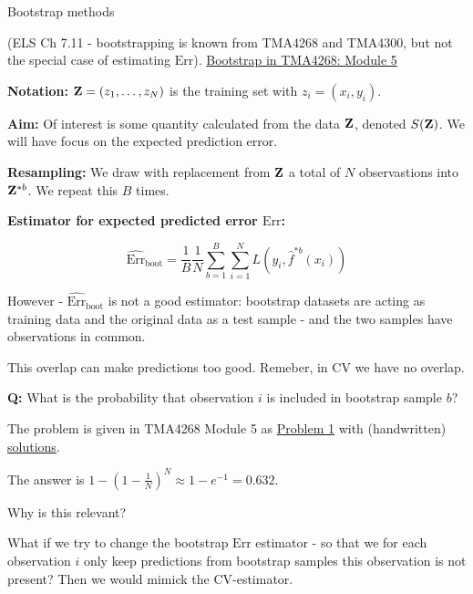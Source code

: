 \documentclass[
  ignorenonframetext,
]{beamer}
\begin{document}
\begin{frame}

\begin{block}{Bootstrap methods}

(ELS Ch 7.11 - bootstrapping is known from TMA4268 and TMA4300, but not
the special case of estimating \(\text{Err}\)).
\href{https://www.math.ntnu.no/emner/TMA4268/2019v/5Resample/5Resample.html\#the_bootstrap}{Bootstrap
in TMA4268: Module 5}

\textbf{Notation:} \({\bf Z}=(z_1,\ldots,z_N)\) is the training set with
\(z_i=(x_i,y_i)\).

\textbf{Aim:} Of interest is some quantity calculated from the data
\({\bf Z}\), denoted \(S({\bf Z})\). We will have focus on the expected
prediction error.

\textbf{Resampling:} We draw with replacement from \({\bf Z}\) a total
of \(N\) observastions into \({\bf Z}^{*b}\). We repeat this \(B\)
times.

\textbf{Estimator for expected predicted error \(\text{Err}\):}

\[\widehat{\text{Err}}_{\text{boot}}=\frac{1}{B}\frac{1}{N}\sum_{b=1}^B \sum_{i=1}^N L(y_i,\hat{f}^{*b}(x_i))\]

\end{block}

\end{frame}

\begin{frame}

However - \(\widehat{\text{Err}}_{\text{boot}}\) is not a good
estimator: bootstrap datasets are acting as training data and the
original data as a test sample - and the two samples have observations
in common.

This overlap can make predictions too good. Remeber, in CV we have no
overlap.

\textbf{Q:} What is the probability that observation \(i\) is included
in bootstrap sample \(b\)?

\end{frame}

\begin{frame}

The problem is given in TMA4268 Module 5 as
\href{https://www.math.ntnu.no/emner/TMA4268/2019v/5Resample/5Resample.html\#recexboot}{Problem
1} with (handwritten)
\href{https://www.math.ntnu.no/emner/TMA4268/2019v/5Resample/5Resample-sol.pdf}{solutions}.

The answer is \(1-(1-\frac{1}{N})^N\approx 1-e^{-1}=0.632\).

Why is this relevant?

What if we try to change the bootstrap \(\text{Err}\) estimator - so
that we for each observation \(i\) only keep predictions from bootstrap
samples this observation is not present? Then we would mimick the
CV-estimator.

\end{frame}
\end{document}
